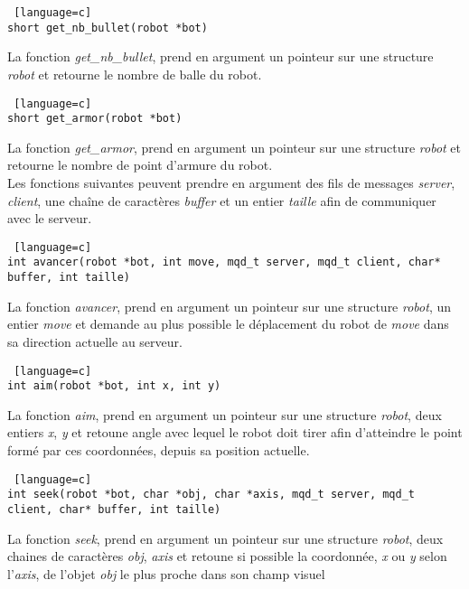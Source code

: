 \documentclass[a4paper, 11pt]{article}
\begin{document}
\begin {lstlisting} [language=c]
short get_nb_bullet(robot *bot)
\end{lstlisting}
La fonction \emph{get\_nb\_bullet}, prend en argument un pointeur sur une structure \emph{robot} et retourne le nombre de balle du robot.\\

\begin {lstlisting} [language=c]
short get_armor(robot *bot)
\end{lstlisting}
La fonction \emph{get\_armor}, prend en argument un pointeur sur une structure \emph{robot} et retourne le nombre de point d'armure du robot.\\

Les fonctions suivantes peuvent prendre en argument des fils de messages \emph{server}, \emph{client}, une chaîne de caractères \emph{buffer} et un entier \emph{taille} afin de communiquer avec le serveur.\\

\begin {lstlisting} [language=c]
int avancer(robot *bot, int move, mqd_t server, mqd_t client, char* buffer, int taille)
\end{lstlisting}
La fonction \emph{avancer}, prend en argument un pointeur sur une structure \emph{robot}, un entier \emph{move} et demande au plus possible le déplacement du robot de \emph{move} dans sa direction actuelle au serveur.\\

\begin {lstlisting} [language=c]
int aim(robot *bot, int x, int y)
\end{lstlisting}
La fonction \emph{aim}, prend en argument un pointeur sur une structure \emph{robot}, deux entiers \emph{x}, \emph{y} et retoune angle avec lequel le robot doit tirer afin d'atteindre le point formé par ces coordonnées, depuis sa position actuelle.\\

\begin {lstlisting} [language=c]
int seek(robot *bot, char *obj, char *axis, mqd_t server, mqd_t client, char* buffer, int taille)
\end{lstlisting}
La fonction \emph{seek}, prend en argument un pointeur sur une structure \emph{robot}, deux chaines de caractères \emph{obj}, \emph{axis} et retoune si possible la coordonnée, \emph{x} ou \emph{y} selon l'\emph{axis}, de l'objet \emph{obj} le plus proche dans son champ visuel\\
\end{document}
